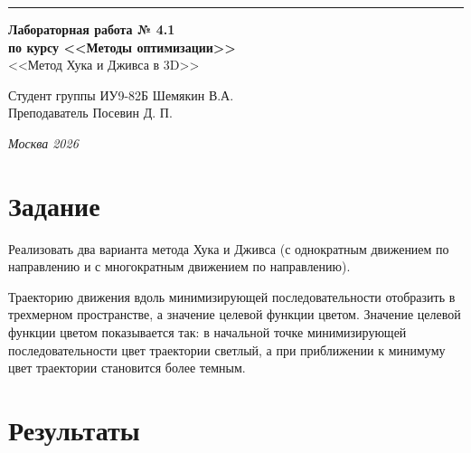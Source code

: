 \documentclass[a4paper, 14pt]{extarticle}
\begin{document}
\begin{titlepage}
\vspace*{-16pt}
\hspace{30pt}\rule{0.866\textwidth}{0.4pt}
  
\vspace{11em}

\begin{center}
\Large {\bf Лабораторная работа № 4.1} \\ 
\large {\bf по курсу <<Методы оптимизации>>} \\
\large <<Метод Хука и Дживса в 3D>> 
\end{center}\normalsize

\vspace{8em}


\begin{flushright}
  {Студент группы ИУ9-82Б Шемякин В.А. \hspace*{15pt}\\ 
  \vspace{2ex}
  Преподаватель Посевин Д. П.\hspace*{15pt}}
\end{flushright}

\bigskip

\vfill
 

\begin{center}
\textsl{Москва 2026}
\end{center}
\end{titlepage}

\renewcommand{\ttdefault}{pcr}

\setlength{\tabcolsep}{3pt}
\newpage
\setcounter{page}{2}

\section{Задание}\label{Sect::task}
Реализовать два варианта метода Хука и Дживса (с однократным движением по направлению и с многократным движением по направлению).

Траекторию движения вдоль минимизирующей последовательности отобразить в трехмерном пространстве, а значение целевой функции цветом. Значение целевой функции цветом показывается так: в начальной точке минимизирующей последовательности цвет траектории светлый, а при приближении к минимуму цвет траектории становится более темным.
\section{Результаты}\label{Sect::res}
\end{document}

